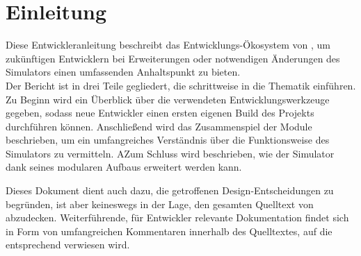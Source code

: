 
\section{Einleitung}

Diese Entwickleranleitung beschreibt das Entwicklungs-Ökosystem von \erasim, um
zukünftigen Entwicklern bei Erweiterungen oder notwendigen Änderungen des
Simulators einen umfassenden Anhaltspunkt zu bieten. \\
Der Bericht ist in drei Teile gegliedert, die schrittweise in die Thematik
einführen. Zu Beginn wird ein Überblick über die verwendeten
Entwicklungswerkzeuge gegeben, sodass neue Entwickler einen ersten eigenen Build
des Projekts durchführen können. Anschließend wird das Zusammenspiel der
Module beschrieben, um ein umfangreiches Verständnis über die Funktionsweise
des Simulators zu vermitteln. AZum Schluss wird beschrieben, wie der Simulator
dank seines modularen Aufbaus erweitert werden kann.

Dieses Dokument dient auch dazu, die getroffenen Design-Entscheidungen zu
begründen, ist aber keineswegs in der Lage, den gesamten Quelltext von \erasim
abzudecken. Weiterführende, für Entwickler relevante Dokumentation findet sich
in Form von umfangreichen Kommentaren innerhalb des Quelltextes, auf die
entsprechend verwiesen wird.
